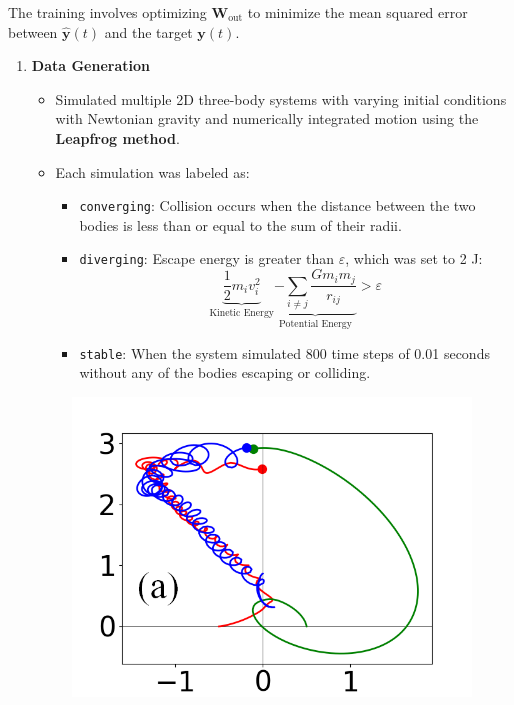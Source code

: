\documentclass[%
 reprint,
 amsmath,amssymb,
 aps,
]{revtex4-2}
\begin{document}
The training involves optimizing $\mathbf{W}_{\text{out}}$ to minimize the mean squared error between $\hat{\mathbf{y}}(t)$ and the target $\mathbf{y}(t)$.


    \begin{enumerate}
        \item \textbf{Data Generation}
        \begin{itemize}
            \item Simulated multiple 2D three-body systems with varying initial conditions with Newtonian gravity and numerically integrated motion using the \textbf{Leapfrog method}.
            \item Each simulation was labeled as: 
            \begin{itemize}
                \item \texttt{converging}: Collision occurs when the distance between the two bodies is less than or equal to the sum of their radii.
                \item \texttt{diverging}: Escape energy is greater than $\varepsilon$, which was set to 2 J: \[
                \underbrace{\frac{1}{2}m_i v_i^2}_{\text{Kinetic Energy}} \underbrace{-\sum_{i \ne j} \frac{G m_i m_j}{r_{ij}}}_{\text{Potential Energy}} > \varepsilon
                \] 
                \item \texttt{stable}: When the system simulated 800 time steps of 0.01 seconds without any of the bodies escaping or colliding.
            \end{itemize}
        \end{itemize}
    \begin{figure}
        \centering
            \begin{minipage}{0.15723\textwidth}
                \centering
                \includegraphics[width=\linewidth]{threebodies_15_marked.png}

\end{minipage}
\end{figure}
\end{enumerate}
\end{document}
